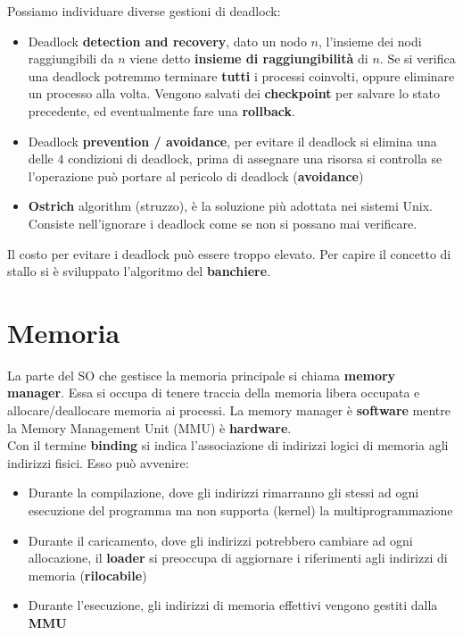 \documentclass{article}
\begin{document}
Possiamo individuare diverse gestioni di deadlock:
\begin{itemize}
  \item Deadlock \textbf{detection and recovery}, dato un nodo $n$, l'insieme dei nodi raggiungibili da $n$ viene detto \textbf{insieme di raggiungibilità} di $n$. Se si verifica una deadlock potremmo terminare \textbf{tutti} i processi coinvolti, oppure eliminare un processo alla volta. Vengono salvati dei \textbf{checkpoint} per salvare lo stato precedente, ed eventualmente fare una \textbf{rollback}.
  \item Deadlock \textbf{prevention / avoidance}, per evitare il deadlock si elimina una delle $4$ condizioni di deadlock, prima di assegnare una risorsa si controlla se l'operazione può portare al pericolo di deadlock (\textbf{avoidance})
  \item \textbf{Ostrich} algorithm (struzzo), è la soluzione più adottata nei sistemi Unix. Consiste nell'ignorare i deadlock come se non si possano mai verificare.
\end{itemize}
Il costo per evitare i deadlock può essere troppo elevato.
Per capire il concetto di stallo si è sviluppato l'algoritmo del \textbf{banchiere}.

\section{Memoria}
La parte del SO che gestisce la memoria principale si chiama \textbf{memory manager}. Essa si occupa di tenere traccia della memoria libera occupata e allocare/deallocare memoria ai processi. La memory manager è \textbf{software} mentre la Memory Management Unit (MMU) è \textbf{hardware}.\\
Con il termine \textbf{binding} si indica l'associazione di indirizzi logici di memoria agli indirizzi fisici. Esso può avvenire:
\begin{itemize}
  \item Durante la compilazione, dove gli indirizzi rimarranno gli stessi ad ogni esecuzione del programma ma non supporta (kernel) la multiprogrammazione
  \item Durante il caricamento, dove gli indirizzi potrebbero cambiare ad ogni allocazione, il \textbf{loader} si preoccupa di aggiornare i riferimenti agli indirizzi di memoria (\textbf{rilocabile})
  \item Durante l'esecuzione, gli indirizzi di memoria effettivi vengono gestiti dalla \textbf{MMU}
\end{itemize}
\end{document}
